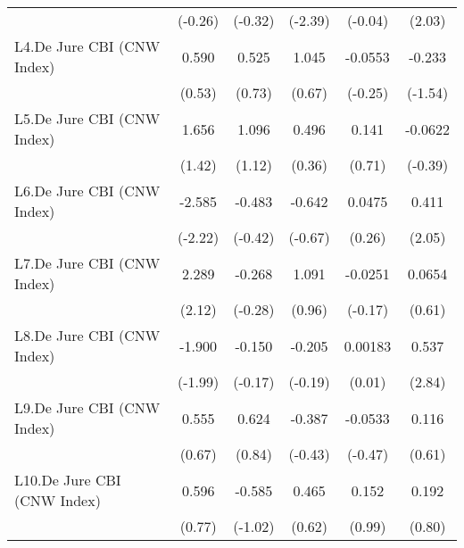 {\begin{tabular}{l*{5}{c}}
                                        &  (-0.26)         &  (-0.32)         &  (-2.39)         &  (-0.04)         &   (2.03)         \\
\addlinespace
L4.De Jure CBI (CNW Index)              &    0.590         &    0.525         &    1.045         &  -0.0553         &   -0.233         \\
                                        &   (0.53)         &   (0.73)         &   (0.67)         &  (-0.25)         &  (-1.54)         \\
\addlinespace
L5.De Jure CBI (CNW Index)              &    1.656         &    1.096         &    0.496         &    0.141         &  -0.0622         \\
                                        &   (1.42)         &   (1.12)         &   (0.36)         &   (0.71)         &  (-0.39)         \\
\addlinespace
L6.De Jure CBI (CNW Index)              &   -2.585\sym{*}  &   -0.483         &   -0.642         &   0.0475         &    0.411\sym{*}  \\
                                        &  (-2.22)         &  (-0.42)         &  (-0.67)         &   (0.26)         &   (2.05)         \\
\addlinespace
L7.De Jure CBI (CNW Index)              &    2.289\sym{*}  &   -0.268         &    1.091         &  -0.0251         &   0.0654         \\
                                        &   (2.12)         &  (-0.28)         &   (0.96)         &  (-0.17)         &   (0.61)         \\
\addlinespace
L8.De Jure CBI (CNW Index)              &   -1.900\sym{*}  &   -0.150         &   -0.205         &  0.00183         &    0.537\sym{**} \\
                                        &  (-1.99)         &  (-0.17)         &  (-0.19)         &   (0.01)         &   (2.84)         \\
\addlinespace
L9.De Jure CBI (CNW Index)              &    0.555         &    0.624         &   -0.387         &  -0.0533         &    0.116         \\
                                        &   (0.67)         &   (0.84)         &  (-0.43)         &  (-0.47)         &   (0.61)         \\
\addlinespace
L10.De Jure CBI (CNW Index)             &    0.596         &   -0.585         &    0.465         &    0.152         &    0.192         \\
                                        &   (0.77)         &  (-1.02)         &   (0.62)         &   (0.99)         &   (0.80)         \\

\end{tabular}}

